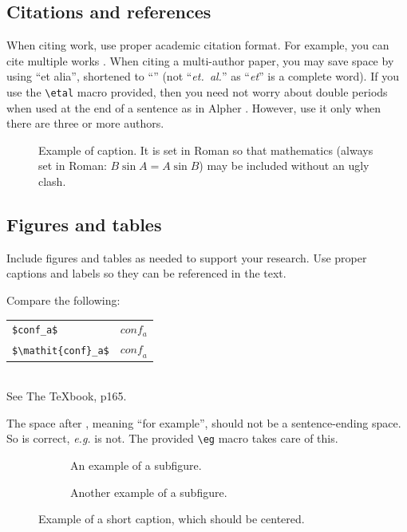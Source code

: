 \subsection{Citations and references}

When citing work, use proper academic citation format. 
For example, you can cite multiple works \cite{Alpher02,Alpher03,Alpher04}.
When citing a multi-author paper, you may save space by using ``et alia'', shortened to ``\etal'' (not ``{\em et.\ al.}'' as ``{\em et}'' is a complete word).
If you use the \verb'\etal' macro provided, then you need not worry about double periods when used at the end of a sentence as in Alpher \etal.
However, use it only when there are three or more authors.

\begin{figure}[t]
  \centering
  \fbox{\rule{0pt}{2in} \rule{0.9\linewidth}{0pt}}

   \caption{Example of caption.
   It is set in Roman so that mathematics (always set in Roman: $B \sin A = A \sin B$) may be included without an ugly clash.}
   \label{fig:onecol}
\end{figure}

\subsection{Figures and tables}

Include figures and tables as needed to support your research.
Use proper captions and labels so they can be referenced in the text.

\noindent
Compare the following:\\
\begin{tabular}{ll}
 \verb'$conf_a$' &  $conf_a$ \\
 \verb'$\mathit{conf}_a$' & $\mathit{conf}_a$
\end{tabular}\\
See The \TeX book, p165.

The space after \eg, meaning ``for example'', should not be a sentence-ending space.
So \eg is correct, {\em e.g.} is not.
The provided \verb'\eg' macro takes care of this.

\begin{figure}
  \centering
  \begin{subfigure}{0.68\linewidth}
    \fbox{\rule{0pt}{2in} \rule{.9\linewidth}{0pt}}
    \caption{An example of a subfigure.}
    \label{fig:short-a}
  \end{subfigure}
  \hfill
  \begin{subfigure}{0.28\linewidth}
    \fbox{\rule{0pt}{2in} \rule{.9\linewidth}{0pt}}
    \caption{Another example of a subfigure.}
    \label{fig:short-b}
  \end{subfigure}
  \caption{Example of a short caption, which should be centered.}
  \label{fig:short}
\end{figure}
